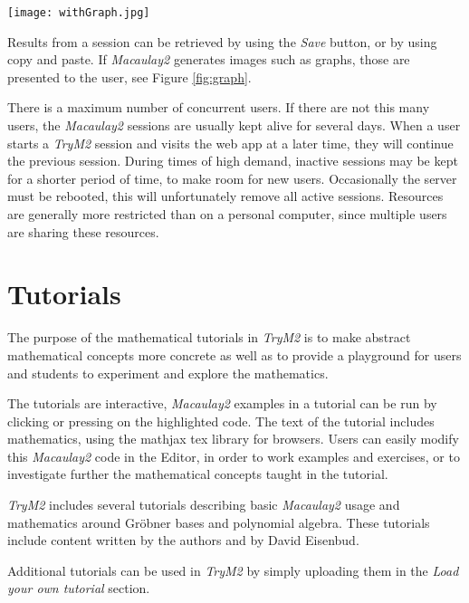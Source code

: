 \documentclass[twocolumn]{article}
\def\trym2{{\it TryM2}}
\def\M2{{\it Macaulay2}}
\begin{document}
\begin{figure*}[htb]
    \texttt{[image: withGraph.jpg]}
    \caption{Screenshot after the user
      has generated an image. Some \M2 packages can generate
      graphs. By invoking the command {\tt displayGraph}, the image is
      generated on the server and displayed to the user.}
    \label{fig:graph}
\end{figure*}

Results from a session can be retrieved by using the {\it Save}
button, or by using copy and paste. If \M2 generates
images such as graphs, those are presented to the user, see Figure \ref{fig:graph}.

There is a maximum number of concurrent users.  If there are not this
many users, the \M2 sessions are usually kept alive for several
days. When a user starts a \trym2 session and visits the web app at a
later time, they will continue the previous session. During times of
high demand, inactive sessions may be kept for a shorter period of
time, to make room for new users.  Occasionally the server must be
rebooted, this will unfortunately remove all active sessions.
Resources are generally more restricted than on a personal computer,
since multiple users are sharing these resources.

\section{Tutorials}

The purpose of the mathematical tutorials in \trym2 is to make abstract
mathematical concepts more concrete as well as to provide a playground for users
and students to experiment and explore the mathematics.

The tutorials are interactive, \M2 examples in a tutorial can be run
by clicking or pressing on the highlighted code.  The text of the
tutorial includes mathematics, using the mathjax tex library for
browsers.  Users can easily modify this \M2 code in the Editor, in
order to work examples and exercises, or to investigate further the
mathematical concepts taught in the tutorial.

\trym2 includes several tutorials describing basic \M2 usage and
mathematics around Gr\"obner bases and polynomial algebra.  These
tutorials include content written by the authors and by David
Eisenbud.

Additional tutorials can be used in \trym2 by simply uploading them in the
{\it Load your own tutorial} section.
\end{document}
